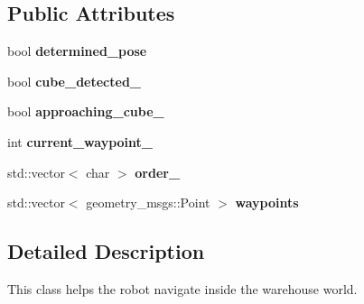 \subsection*{Public Attributes}
\begin{DoxyCompactItemize}
\item 
\mbox{\label{class_navigator_ac83ca126d5ea51353394f2950426ed30}} 
bool {\bfseries determined\+\_\+pose}
\item 
\mbox{\label{class_navigator_a3da5ff304e7a352805f58ab1396c93e8}} 
bool {\bfseries cube\+\_\+detected\+\_\+}
\item 
\mbox{\label{class_navigator_a55501e55ae8de0744c531421dd3f8ea7}} 
bool {\bfseries approaching\+\_\+cube\+\_\+}
\item 
\mbox{\label{class_navigator_a6f74f861546daf99dfbe54fe92fd9f31}} 
int {\bfseries current\+\_\+waypoint\+\_\+}
\item 
\mbox{\label{class_navigator_a1e9d62a9a446f83347ec6507264de9e3}} 
std\+::vector$<$ char $>$ {\bfseries order\+\_\+}
\item 
\mbox{\label{class_navigator_a40d886926a48b8aaa3f76f45b5e9e11c}} 
std\+::vector$<$ geometry\+\_\+msgs\+::\+Point $>$ {\bfseries waypoints}
\end{DoxyCompactItemize}


\subsection{Detailed Description}
This class helps the robot navigate inside the warehouse world. 

